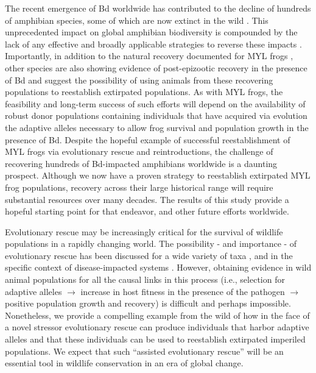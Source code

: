 \documentclass[9pt,twocolumn,twoside,lineno]{pnas-new}
\begin{document}
The recent emergence of Bd worldwide has contributed to the decline of
hundreds of amphibian species, some of which are now extinct in the wild
\citep{scheele2019}. This unprecedented impact on global amphibian
biodiversity is compounded by the lack of any effective and broadly
applicable strategies to reverse these impacts
\citep{garner2016, knapp2022}. Importantly, in addition to the natural
recovery documented for MYL frogs \citep{knapp2016}, other species are
also showing evidence of post-epizootic recovery in the presence of Bd
\citep{scheele2017, voyles2018} and suggest the possibility of using
animals from these recovering populations to reestablish extirpated
populations. As with MYL frogs, the feasibility and long-term success of
such efforts will depend on the availability of robust donor populations
containing individuals that have acquired via evolution the adaptive
alleles necessary to allow frog survival and population growth in the
presence of Bd. Despite the hopeful example of successful
reestablishment of MYL frogs via evolutionary rescue and
reintroductions, the challenge of recovering hundreds of Bd-impacted
amphibians worldwide is a daunting prospect. Although we now have a
proven strategy to reestablish extirpated MYL frog populations, recovery
across their large historical range will require substantial resources
over many decades. The results of this study provide a hopeful starting
point for that endeavor, and other future efforts worldwide.

Evolutionary rescue may be increasingly critical for the survival of
wildlife populations in a rapidly changing world. The possibility - and
importance - of evolutionary rescue has been discussed for a wide
variety of taxa \citep[e.g.,][]{mills2018, oziolor2019}, and in the
specific context of disease-impacted systems \citep{searle2020}.
However, obtaining evidence in wild animal populations for all the
causal links in this process (i.e., selection for adaptive alleles
\(\rightarrow\) increase in host fitness in the presence of the pathogen
\(\rightarrow\) positive population growth and recovery) is difficult
and perhaps impossible. Nonetheless, we provide a compelling example
from the wild of how in the face of a novel stressor evolutionary rescue
can produce individuals that harbor adaptive alleles and that these
individuals can be used to reestablish extirpated imperiled populations.
We expect that such ``assisted evolutionary rescue'' will be an
essential tool in wildlife conservation in an era of global change.
\end{document}
